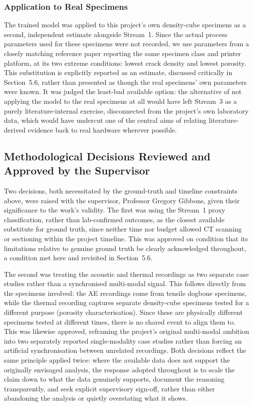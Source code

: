 \documentclass[a4paper]{article}
\begin{document}
\subsubsection{Application to Real Specimens}
The trained model was applied to this project's own density-cube specimens as a second, independent estimate alongside Stream~1. Since the actual process parameters used for these specimens were not recorded, we use parameters from a closely matching reference paper \citep{marchese2020} reporting the same specimen class and printer platform, at its two extreme conditions: lowest crack density and lowest porosity. This substitution is explicitly reported as an estimate, discussed critically in Section~5.6, rather than presented as though the real specimens' own parameters were known. It was judged the least-bad available option: the alternative of not applying the model to the real specimens at all would have left Stream~3 as a purely literature-internal exercise, disconnected from the project's own laboratory data, which would have undercut one of the central aims of relating literature-derived evidence back to real hardware wherever possible.

\subsection{Methodological Decisions Reviewed and Approved by the Supervisor}
Two decisions, both necessitated by the ground-truth and timeline constraints above, were raised with the supervisor, Professor Gregory Gibbons, given their significance to the work's validity. The first was using the Stream~1 proxy classification, rather than lab-confirmed outcomes, as the closest available substitute for ground truth, since neither time nor budget allowed CT scanning or sectioning within the project timeline. This was approved on condition that its limitations relative to genuine ground truth be clearly acknowledged throughout, a condition met here and revisited in Section~5.6.

The second was treating the acoustic and thermal recordings as two separate case studies rather than a synchronised multi-modal signal. This follows directly from the specimens involved: the AE recordings come from tensile dogbone specimens, while the thermal recording captures separate density-cube specimens tested for a different purpose (porosity characterisation). Since these are physically different specimens tested at different times, there is no shared event to align them to. This was likewise approved, reframing the project's original multi-modal ambition into two separately reported single-modality case studies rather than forcing an artificial synchronisation between unrelated recordings. Both decisions reflect the same principle applied twice: where the available data does not support the originally envisaged analysis, the response adopted throughout is to scale the claim down to what the data genuinely supports, document the reasoning transparently, and seek explicit supervisory sign-off, rather than either abandoning the analysis or quietly overstating what it shows.
\end{document}
